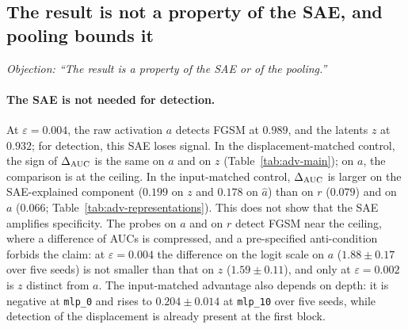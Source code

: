 \documentclass[../ppgc-tese.tex]{subfiles}
\begin{document}
\subsection{The result is not a property of the SAE, and pooling bounds it}
\label{sec:adv-scope}
\emph{Objection: ``The result is a property of the SAE or of the pooling.''}

\paragraph*{The SAE is not needed for detection.}
At $\varepsilon{=}0.004$, the raw activation $a$ detects FGSM at $0.989$, and
the latents $z$ at $0.932$; for detection, this SAE loses signal.
In the displacement-matched control, the sign of $\Delta_{\mathrm{AUC}}$ is the same on $a$
and on $z$ (Table~\ref{tab:adv-main}); on $a$, the comparison is at the
ceiling. In the input-matched control, $\Delta_{\mathrm{AUC}}$ is larger on the SAE-explained
component ($0.199$ on $z$ and $0.178$ on $\hat{a}$) than on $r$ ($0.079$) and
on $a$ ($0.066$; Table~\ref{tab:adv-representations}). This does not show that
the SAE amplifies specificity. The probes on $a$ and on $r$ detect FGSM near
the ceiling, where a difference of AUCs is compressed, and a pre-specified
anti-condition forbids the claim: at $\varepsilon{=}0.004$ the difference on
the logit scale on $a$ ($1.88\pm0.17$ over five seeds) is not smaller than
that on $z$ ($1.59\pm0.11$), and only at $\varepsilon{=}0.002$ is $z$ distinct
from $a$.
The input-matched advantage also depends on depth: it is negative at \texttt{mlp\_0} and rises
to $0.204\pm0.014$ at \texttt{mlp\_10} over five seeds, while detection of the
displacement is already present at the first block.
\end{document}
